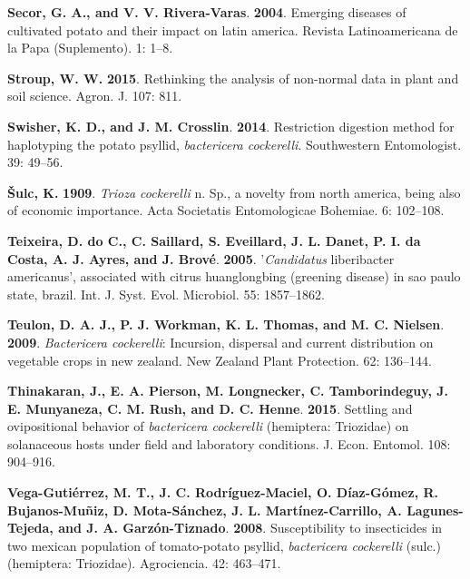 \documentclass[]{article}
\begin{document}
\leavevmode\hypertarget{ref-Secor2004}{}%
\textbf{Secor, G. A., and V. V. Rivera-Varas}. \textbf{2004}. Emerging
diseases of cultivated potato and their impact on latin america. Revista
Latinoamericana de la Papa (Suplemento). 1: 1--8.

\leavevmode\hypertarget{ref-Stroup2015}{}%
\textbf{Stroup, W. W.} \textbf{2015}. Rethinking the analysis of
non-normal data in plant and soil science. Agron. J. 107: 811.

\leavevmode\hypertarget{ref-Swisher2014a}{}%
\textbf{Swisher, K. D., and J. M. Crosslin}. \textbf{2014}. Restriction
digestion method for haplotyping the potato psyllid, \emph{bactericera
cockerelli}. Southwestern Entomologist. 39: 49--56.

\leavevmode\hypertarget{ref-Sulc1909}{}%
\textbf{Šulc, K.} \textbf{1909}. \emph{Trioza cockerelli} n. Sp., a
novelty from north america, being also of economic importance. Acta
Societatis Entomologicae Bohemiae. 6: 102--108.

\leavevmode\hypertarget{ref-Teixeira2005}{}%
\textbf{Teixeira, D. do C., C. Saillard, S. Eveillard, J. L. Danet, P.
I. da Costa, A. J. Ayres, and J. Brové}. \textbf{2005}.
'\emph{Candidatus} liberibacter americanus', associated with citrus
huanglongbing (greening disease) in sao paulo state, brazil. Int. J.
Syst. Evol. Microbiol. 55: 1857--1862.

\leavevmode\hypertarget{ref-Teulon2009}{}%
\textbf{Teulon, D. A. J., P. J. Workman, K. L. Thomas, and M. C.
Nielsen}. \textbf{2009}. \emph{Bactericera cockerelli}: Incursion,
dispersal and current distribution on vegetable crops in new zealand.
New Zealand Plant Protection. 62: 136--144.

\leavevmode\hypertarget{ref-Thinakaran2015}{}%
\textbf{Thinakaran, J., E. A. Pierson, M. Longnecker, C. Tamborindeguy,
J. E. Munyaneza, C. M. Rush, and D. C. Henne}. \textbf{2015}. Settling
and ovipositional behavior of \emph{bactericera cockerelli} (hemiptera:
Triozidae) on solanaceous hosts under field and laboratory conditions.
J. Econ. Entomol. 108: 904--916.

\leavevmode\hypertarget{ref-Vega-Gutierrez2008}{}%
\textbf{Vega-Gutiérrez, M. T., J. C. Rodríguez-Maciel, O. Díaz-Gómez, R.
Bujanos-Muñiz, D. Mota-Sánchez, J. L. Martínez-Carrillo, A.
Lagunes-Tejeda, and J. A. Garzón-Tiznado}. \textbf{2008}. Susceptibility
to insecticides in two mexican population of tomato-potato psyllid,
\emph{bactericera cockerelli} (sulc.) (hemiptera: Triozidae).
Agrociencia. 42: 463--471.
\end{document}
